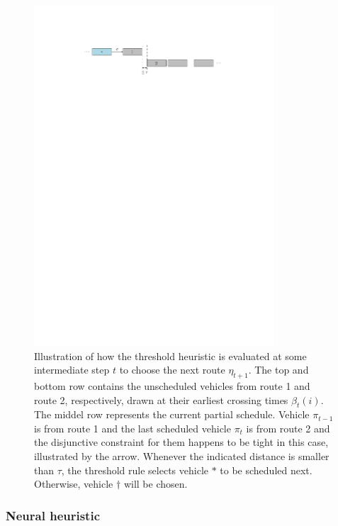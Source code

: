 \documentclass[a4paper]{article}
\theoremstyle{definition}
\theoremstyle{plain}
\begin{document}
\begin{figure}
  \centering
  \includegraphics[width=0.8\textwidth]{figures/single/threshold}
  \caption{Illustration of how the threshold heuristic is evaluated at some
    intermediate step $t$ to choose the next route $\eta_{t+1}$. The top and
    bottom row contains the unscheduled vehicles from route 1 and route 2,
    respectively, drawn at their earliest crossing times $\beta_{t}(i)$. The
    middel row represents the current partial schedule. Vehicle $\pi_{t-1}$ is
    from route 1 and the last scheduled vehicle $\pi_{t}$ is from route 2 and
    the disjunctive constraint for them happens to be tight in this case,
    illustrated by the arrow. Whenever the indicated distance is smaller than
    $\tau$, the threshold rule selects vehicle $*$ to be scheduled next. Otherwise,
    vehicle $\dagger$ will be chosen.}\label{fig:threshold_heuristic}
\end{figure}


\subsubsection{Neural heuristic}
\label{sec:neural}
\end{document}
